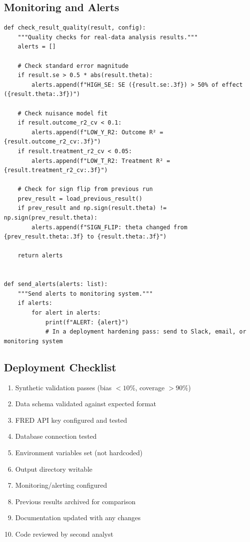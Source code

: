 \subsection{Monitoring and Alerts}

\begin{verbatim}
def check_result_quality(result, config):
    """Quality checks for real-data analysis results."""
    alerts = []

    # Check standard error magnitude
    if result.se > 0.5 * abs(result.theta):
        alerts.append(f"HIGH_SE: SE ({result.se:.3f}) > 50% of effect ({result.theta:.3f})")

    # Check nuisance model fit
    if result.outcome_r2_cv < 0.1:
        alerts.append(f"LOW_Y_R2: Outcome R² = {result.outcome_r2_cv:.3f}")
    if result.treatment_r2_cv < 0.05:
        alerts.append(f"LOW_T_R2: Treatment R² = {result.treatment_r2_cv:.3f}")

    # Check for sign flip from previous run
    prev_result = load_previous_result()
    if prev_result and np.sign(result.theta) != np.sign(prev_result.theta):
        alerts.append(f"SIGN_FLIP: theta changed from {prev_result.theta:.3f} to {result.theta:.3f}")

    return alerts


def send_alerts(alerts: list):
    """Send alerts to monitoring system."""
    if alerts:
        for alert in alerts:
            print(f"ALERT: {alert}")
            # In a deployment hardening pass: send to Slack, email, or monitoring system
\end{verbatim}

\subsection{Deployment Checklist}

\begin{enumerate}
    \item[$\square$] Synthetic validation passes (bias $< 10\%$, coverage $> 90\%$)
    \item[$\square$] Data schema validated against expected format
    \item[$\square$] FRED API key configured and tested
    \item[$\square$] Database connection tested
    \item[$\square$] Environment variables set (not hardcoded)
    \item[$\square$] Output directory writable
    \item[$\square$] Monitoring/alerting configured
    \item[$\square$] Previous results archived for comparison
    \item[$\square$] Documentation updated with any changes
    \item[$\square$] Code reviewed by second analyst
\end{enumerate}

